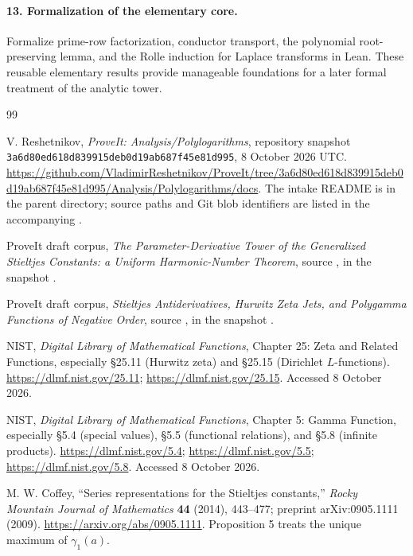 \documentclass[11pt,a4paper]{article}
\theoremstyle{definition}
\theoremstyle{remark}
\numberwithin{equation}{section}
\begin{document}
\paragraph{13. Formalization of the elementary core.}
Formalize prime-row factorization, conductor transport, the polynomial
root-preserving lemma, and the Rolle induction for Laplace transforms
in Lean. These reusable elementary results provide manageable foundations
for a later formal treatment of the analytic tower.

\clearpage
{}
{}
\begingroup
\small
\setlength{\parskip}{0pt}
\begin{thebibliography}{99}
\setlength{\itemsep}{4pt}
\raggedright

V. Reshetnikov, \emph{ProveIt: Analysis/Polylogarithms},
repository snapshot
\texttt{3a6d80ed618d839915deb0d19ab687f45e81d995},
8 October 2026 UTC.
\url{https://github.com/VladimirReshetnikov/ProveIt/tree/3a6d80ed618d839915deb0d19ab687f45e81d995/Analysis/Polylogarithms/docs}.
The intake README is in the parent directory; source paths and Git
blob identifiers are listed in the accompanying .

ProveIt draft corpus, \emph{The Parameter-Derivative Tower of the
Generalized Stieltjes Constants: a Uniform Harmonic-Number Theorem}, source
,
in the snapshot \cite{RepoSnapshot}.

ProveIt draft corpus, \emph{Stieltjes Antiderivatives, Hurwitz Zeta Jets,
and Polygamma Functions of Negative Order}, source
,
in the snapshot \cite{RepoSnapshot}.

NIST, \emph{Digital Library of Mathematical Functions},
Chapter 25: Zeta and Related Functions, especially
\S25.11 (Hurwitz zeta) and \S25.15 (Dirichlet $L$-functions).
\url{https://dlmf.nist.gov/25.11};
\url{https://dlmf.nist.gov/25.15}.
Accessed 8 October 2026.

NIST, \emph{Digital Library of Mathematical Functions},
Chapter 5: Gamma Function, especially \S5.4 (special values),
\S5.5 (functional relations), and \S5.8 (infinite products).
\url{https://dlmf.nist.gov/5.4};
\url{https://dlmf.nist.gov/5.5};
\url{https://dlmf.nist.gov/5.8}.
Accessed 8 October 2026.

M. W. Coffey, “Series representations for the Stieltjes constants,”
\emph{Rocky Mountain Journal of Mathematics} \textbf{44} (2014),
443--477; preprint arXiv:0905.1111 (2009).
\url{https://arxiv.org/abs/0905.1111}.
Proposition 5 treats the unique maximum of $\gamma_1(a)$.


\end{thebibliography}
\end{document}
